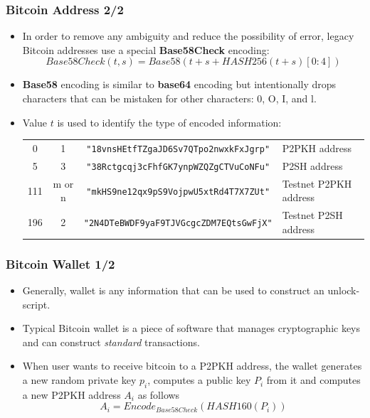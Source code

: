 \documentclass{beamer}
\begin{document}
\begin{frame}[fragile]
  \frametitle{Bitcoin Address 2/2}
  \begin{itemize}
  \item In order to remove any ambiguity and reduce the possibility of error,
    legacy Bitcoin addresses use a special \textbf{Base58Check} encoding:
    $$Base58Check(t, s) = Base58(t + s + HASH256(t + s)[0:4])$$
  \item \textbf{Base58} encoding is similar to \textbf{base64} encoding but
    intentionally drops characters that can be mistaken for other characters: 0,
    O, I, and l.
  \item Value $t$ is used to identify the type of encoded information:
    \break
    \break
    \tiny
    \begin{tabular}{cccl}
      0 & 1 & \texttt{"18vnsHEtfTZgaJD6Sv7QTpo2nwxkFxJgrp"} & P2PKH address \\
      5 & 3 & \texttt{"38Rctgcqj3cFhfGK7ynpWZQZgCTVuCoNFu"} & P2SH address \\
      111 & m or n & \texttt{"mkHS9ne12qx9pS9VojpwU5xtRd4T7X7ZUt"} & Testnet P2PKH address \\
      196 & 2 & \texttt{"2N4DTeBWDF9yaF9TJVGcgcZDM7EQtsGwFjX"} & Testnet P2SH address \\
    \end{tabular}
  \end{itemize}
\end{frame}

\begin{frame}[fragile]
  \frametitle{Bitcoin Wallet 1/2}
  \begin{itemize}
  \item Generally, wallet is any information that can be used to construct an
    unlock-script.
  \item Typical Bitcoin wallet is a piece of software that manages cryptographic
    keys and can construct \textit{standard} transactions.
  \item When user wants to receive bitcoin to a P2PKH address, the wallet
    generates a new random private key $p_i$, computes a public key $P_i$ from
    it and computes a new P2PKH address $A_i$ as follows
    $$A_i = Encode_{Base58Check}(HASH160(P_i))$$
  \end{itemize}
\end{frame}
\end{document}

